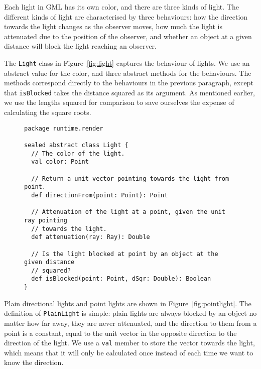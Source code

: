 Each light in GML has its own color, and there are three kinds of light.
The different kinds of light are characterised by three behaviours:
how the direction towards the light changes as the observer moves,
how much the light is attenuated due to the position of the observer,
and whether an object at a given distance will block
the light reaching an observer.

The \verb!Light! class in Figure~\ref{fig:light}
captures the behaviour of lights.
We use an abstract value for the color,
and three abstract methods for the behaviours.
The methods correspond directly to the behaviours in the previous paragraph,
except that \verb!isBlocked! takes the distance squared as its argument.
As mentioned earlier,
we use the lengths squared for comparison
to save ourselves the expense of calculating the square roots.

\begin{figure}
\begin{verbatim}
package runtime.render

sealed abstract class Light {
  // The color of the light.
  val color: Point

  // Return a unit vector pointing towards the light from point.
  def directionFrom(point: Point): Point

  // Attenuation of the light at a point, given the unit ray pointing
  // towards the light.
  def attenuation(ray: Ray): Double

  // Is the light blocked at point by an object at the given distance
  // squared?
  def isBlocked(point: Point, dSqr: Double): Boolean
}
\end{verbatim}
\getcaption
\end{figure}

Plain directional lights and point lights
are shown in Figure~\ref{fig:pointlight}.
The definition of \verb!PlainLight! is simple:
plain lights are always blocked by an object no matter how far away,
they are never attenuated,
and the direction to them from a point is a constant,
equal to the unit vector in the opposite direction
to the direction of the light.
We use a \verb!val! member to store the vector towards the light,
which means that it will only be calculated once
instead of each time we want to know the direction.

